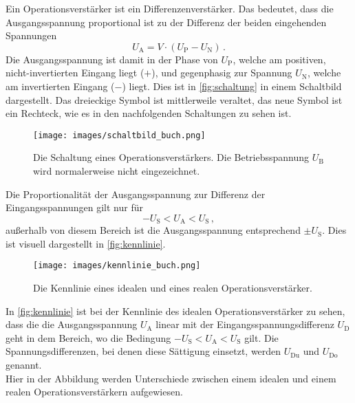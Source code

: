         \noindent 
        Ein Operationsverstärker ist ein Differenzenverstärker. Das bedeutet, dass die Ausgangsspannung proportional ist zu der Differenz der beiden 
        eingehenden Spannungen 
        \begin{equation*}
            U_\text{A} = V \cdot \left( U_\text{P} - U_\text{N}\right)\, .
        \end{equation*}
        Die Ausgangsspannung ist damit in der Phase von $U_\text{P}$, welche am positiven, nicht-invertierten Eingang liegt ($+$), und gegenphasig zur 
        Spannung $U_\text{N}$, welche am invertierten Eingang ($-$) liegt. Dies ist in \autoref{fig:schaltung} in einem Schaltbild dargestellt. 
        Das dreieckige Symbol ist mittlerweile veraltet, das neue Symbol ist ein Rechteck, wie es in den nachfolgenden Schaltungen zu sehen ist. 
        \begin{figure}%
            \centering%
            \texttt{[image: images/schaltbild\_buch.png]}%
            \caption{Die Schaltung eines Operationsverstärkers. Die Betriebsspannung $U_\text{B}$ wird normalerweise nicht eingezeichnet. \cite{BrabetzHaasSpieker+2015}}%
            \label{fig:schaltung}%
        \end{figure}%
        Die Proportionalität der Ausgangsspannung zur Differenz der Eingangsspannungen gilt nur für 
        \begin{equation*}
            - U_\text{S} < U_\text{A} < U_\text{S}\, ,
        \end{equation*}
        außerhalb von diesem Bereich ist die Ausgangsspannung entsprechend $\pm U_\text{S}$. Dies ist visuell dargestellt in \autoref{fig:kennlinie}.
        \begin{figure}%
            \centering%
            \texttt{[image: images/kennlinie\_buch.png]}%
            \caption{Die Kennlinie eines idealen und eines realen Operationsverstärker. \cite{BrabetzHaasSpieker+2015}}%
            \label{fig:kennlinie}%
        \end{figure}%
        In \autoref{fig:kennlinie} ist bei der Kennlinie des idealen Operationsverstärker zu sehen, dass die die Ausgangsspannung $U_\text{A}$ linear 
        mit der Eingangsspannungsdifferenz $U_\text{D}$ geht in dem Bereich, wo die Bedingung $- U_\text{S} < U_\text{A} < U_\text{S}$ gilt. 
        Die Spannungsdifferenzen, bei denen diese Sättigung einsetzt, werden $U_\text{Du}$ und $U_\text{Do}$ genannt. \\
        Hier in der Abbildung werden Unterschiede zwischen einem idealen und einem realen Operationsverstärkern aufgewiesen. 

